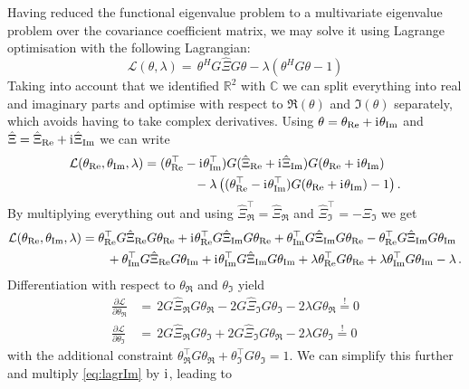 Having reduced the functional eigenvalue problem to a multivariate eigenvalue problem over the covariance coefficient matrix, we may solve it using Lagrange optimisation with the following Lagrangian:
\begin{equation}
  \mathcal{L}(\theta,\lambda) = \, \theta^H G \hat{\Xi} G \theta - \lambda ( \theta^H G \theta - 1)
\end{equation}
Taking into account that we identified $\mathbb{R}^2$ with $\mathbb{C}$ we can split everything into real and imaginary parts and optimise with respect to $\Re(\theta)$ and $\Im(\theta)$ separately, which avoids having to take complex derivatives.
Using $\theta = \theta_{\mathrm{Re}} + \mathrm{i}\mkern1mu \theta_{\mathrm{Im}}$ and $\hat{\Xi} = \hat\Xi_{\mathrm{Re}} + \mathrm{i}\mkern1mu \hat\Xi_{\mathrm{Im}}$ we can write
\begin{align*}
  \mathcal{L}(\theta_{\mathrm{Re}},\theta_{\mathrm{Im}},\lambda) & = 
    (\theta_{\mathrm{Re}}^\top - \mathrm{i}\mkern1mu \theta_{\mathrm{Im}}^\top) G ( \hat{\Xi}_{\mathrm{Re}} + \mathrm{i}\mkern1mu \hat\Xi_{\mathrm{Im}} ) G ( \theta_{\mathrm{Re}} + \mathrm{i}\mkern1mu \theta_{\mathrm{Im}} ) \\
  & \qquad \qquad - \lambda \left( (\theta_{\mathrm{Re}}^\top - \mathrm{i}\mkern1mu \theta_{\mathrm{Im}}^\top ) G (\theta_{\mathrm{Re}} + \mathrm{i}\mkern1mu \theta_{\mathrm{Im}}) - 1 \right).
\end{align*}
By multiplying everything out and using $\hat\Xi_\Re^\top = \hat\Xi_\Re$ and $\hat\Xi_\Im^\top = - \hat\Xi_\Im$ we get
\begin{align*}
  \mathcal{L}(\theta_{\mathrm{Re}},\theta_{\mathrm{Im}},\lambda) 
  & = \theta_{\mathrm{Re}}^\top G \hat\Xi_{\mathrm{Re}} G \theta_{\mathrm{Re}} 
    + \mathrm{i}\mkern1mu \theta_{\mathrm{Re}}^\top G \hat\Xi_{\mathrm{Im}} G \theta_{\mathrm{Re}} 
    + \theta_{\mathrm{Im}}^\top G \hat\Xi_{\mathrm{Im}} G \theta_{\mathrm{Re}}
    - \theta_{\mathrm{Re}}^\top G \hat\Xi_{\mathrm{Im}} G \theta_{\mathrm{Im}} \\
  & \qquad  + \theta_{\mathrm{Im}}^\top G \hat\Xi_{\mathrm{Re}} G \theta_{\mathrm{Im}}
    + \mathrm{i}\mkern1mu \theta_{\mathrm{Im}}^\top G \hat\Xi_{\mathrm{Im}} G \theta_{\mathrm{Im}} 
    + \lambda \theta_{\mathrm{Re}}^\top G \theta_{\mathrm{Re}} + \lambda \theta_{\mathrm{Im}}^\top G \theta_{\mathrm{Im}} - \lambda \,.
\end{align*}
Differentiation with respect to $\theta_\Re$ and $\theta_\Im$ yield
\begin{align}
  \frac{\partial \mathcal{L}}{\partial \theta_\Re} & = \, 
    2G\hat\Xi_\Re G \theta_\Re - 2G\hat\Xi_\Im G \theta_\Im - 2\lambda G\theta_\Re \overset{!}{=} 0 \label{eq:lagrRe}\\
  \frac{\partial \mathcal{L}}{\partial \theta_\Im} & = \,
    2G\hat\Xi_\Re G \theta_\Im + 2G\hat\Xi_\Im G \theta_\Re - 2\lambda G\theta_\Im \overset{!}{=} 0 \label{eq:lagrIm}
\end{align}
with the additional constraint $\theta_\Re^\top G \theta_\Re + \theta_\Im^\top G \theta_\Im = 1$.
We can simplify this further and multiply \cref{eq:lagrIm} by $\mathrm{i}\mkern1mu$, leading to
